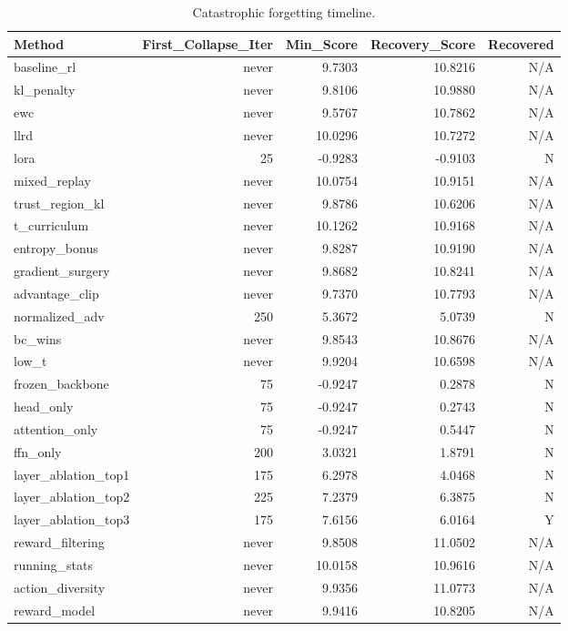 \begin{table}[htbp]
\centering
\caption{Catastrophic forgetting timeline.}
\label{tab:forgetting}
\begin{tabular}{lrrrr}
\toprule
\textbf{Method} & \textbf{First\_Collapse\_Iter} & \textbf{Min\_Score} & \textbf{Recovery\_Score} & \textbf{Recovered} \\
\midrule
baseline\_rl & never & 9.7303 & 10.8216 & N/A \\
kl\_penalty & never & 9.8106 & 10.9880 & N/A \\
ewc & never & 9.5767 & 10.7862 & N/A \\
llrd & never & 10.0296 & 10.7272 & N/A \\
lora & 25 & -0.9283 & -0.9103 & N \\
mixed\_replay & never & 10.0754 & 10.9151 & N/A \\
trust\_region\_kl & never & 9.8786 & 10.6206 & N/A \\
t\_curriculum & never & 10.1262 & 10.9168 & N/A \\
entropy\_bonus & never & 9.8287 & 10.9190 & N/A \\
gradient\_surgery & never & 9.8682 & 10.8241 & N/A \\
advantage\_clip & never & 9.7370 & 10.7793 & N/A \\
normalized\_adv & 250 & 5.3672 & 5.0739 & N \\
bc\_wins & never & 9.8543 & 10.8676 & N/A \\
low\_t & never & 9.9204 & 10.6598 & N/A \\
frozen\_backbone & 75 & -0.9247 & 0.2878 & N \\
head\_only & 75 & -0.9247 & 0.2743 & N \\
attention\_only & 75 & -0.9247 & 0.5447 & N \\
ffn\_only & 200 & 3.0321 & 1.8791 & N \\
layer\_ablation\_top1 & 175 & 6.2978 & 4.0468 & N \\
layer\_ablation\_top2 & 225 & 7.2379 & 6.3875 & N \\
layer\_ablation\_top3 & 175 & 7.6156 & 6.0164 & Y \\
reward\_filtering & never & 9.8508 & 11.0502 & N/A \\
running\_stats & never & 10.0158 & 10.9616 & N/A \\
action\_diversity & never & 9.9356 & 11.0773 & N/A \\
reward\_model & never & 9.9416 & 10.8205 & N/A \\
\bottomrule
\end{tabular}
\end{table}